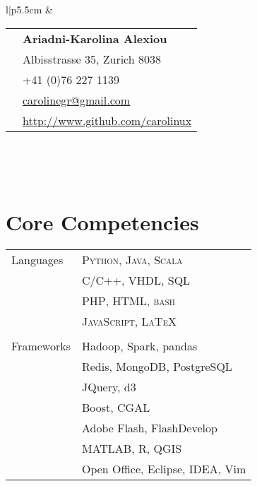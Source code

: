 \documentclass[10pt]{article} %
\begin{document}
\begin{minipage}[t]{0.44\textwidth} %
\vspace{0pt} %


\colorbox{shade}{\textcolor{text1}{
        \begin{tabular}{l|p{5.5cm}}
             &
        \begin{tabular}{l|p{5cm}}
    \raisebox{0pt}{\Smiley} & \textbf{Ariadni-Karolina Alexiou} \\ %
    \raisebox{-1pt}{\textifsymbol{18}} & Albisstrasse 35, Zurich 8038 \\ %
    \raisebox{-1pt}{\Mobilefone} & +41 (0)76 227 1139\\ %
    \raisebox{-1pt}{\Letter} & \href{mailto:carolinegr@gmail.com}{carolinegr@gmail.com} \\ %
    \Keyboard & \href{http://www.github.com/carolinux}{http://www.github.com/carolinux} \\ %
        \end{tabular}  \\ %
\end{tabular}
}
}\\[10pt]






\section{Core Competencies} 

\begin{tabular}{ll}
Languages
& \textsc{Python}, \textsc{Java}, \textsc{Scala} \\
& \textsc{C/C++}, \textsc{VHDL}, \textsc{SQL} \\
& \textsc{PHP}, \textsc{HTML}, \textsc{bash} \\
& \textsc{JavaScript}, \textsc{\LaTeX} \\
&\\
Frameworks
& Hadoop, Spark, pandas \\
& Redis, MongoDB, PostgreSQL \\
& JQuery, d3 \\
& Boost, CGAL \\
& Adobe Flash, FlashDevelop \\
& MATLAB, R, QGIS \\
& Open Office, Eclipse, IDEA, Vim\\



\end{tabular}
\end{minipage}
\end{document}

